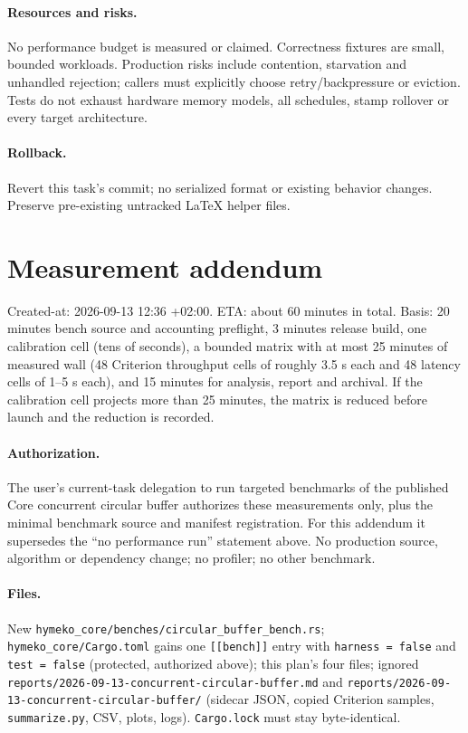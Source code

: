 \documentclass{article}
\begin{document}
\paragraph{Resources and risks.} No performance budget is measured or claimed.
Correctness fixtures are small, bounded workloads. Production risks include
contention, starvation and unhandled rejection; callers must explicitly choose
retry/backpressure or eviction. Tests do not exhaust hardware memory models,
all schedules, stamp rollover or every target architecture.

\paragraph{Rollback.} Revert this task's commit; no serialized format or existing
behavior changes. Preserve pre-existing untracked LaTeX helper files.

\section*{Measurement addendum}
Created-at: 2026-09-13 12:36 +02:00. ETA: about 60 minutes in total. Basis:
20 minutes bench source and accounting preflight, 3 minutes release build, one
calibration cell (tens of seconds), a bounded matrix with at most 25 minutes of
measured wall (48 Criterion throughput cells of roughly 3.5 s each and 48 latency
cells of 1--5 s each), and 15 minutes for analysis, report and archival. If the
calibration cell projects more than 25 minutes, the matrix is reduced before launch
and the reduction is recorded.

\paragraph{Authorization.} The user's current-task delegation to run targeted
benchmarks of the published Core concurrent circular buffer authorizes these
measurements only, plus the minimal benchmark source and manifest registration.
For this addendum it supersedes the ``no performance run'' statement above. No
production source, algorithm or dependency change; no profiler; no other benchmark.

\paragraph{Files.} New \texttt{hymeko\_core/benches/circular\_buffer\_bench.rs};
\texttt{hymeko\_core/Cargo.toml} gains one \texttt{[[bench]]} entry with
\texttt{harness = false} and \texttt{test = false} (protected, authorized above);
this plan's four files; ignored \texttt{reports/2026-09-13-concurrent-circular-buffer.md}
and \texttt{reports/2026-09-13-concurrent-circular-buffer/} (sidecar JSON, copied
Criterion samples, \texttt{summarize.py}, CSV, plots, logs). \texttt{Cargo.lock}
must stay byte-identical.
\end{document}
